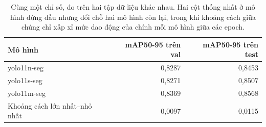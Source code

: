 \begin{table}[H]
\centering
\caption{Cùng một chỉ số, đo trên hai tập dữ liệu khác nhau. Hai cột thống nhất ở mô hình đứng đầu nhưng đổi chỗ hai mô hình còn lại, trong khi khoảng cách giữa chúng chỉ xấp xỉ mức dao động của chính mỗi mô hình giữa các epoch.}
\label{tab:ordering}
\small
\begin{tabular}{l r r}
\toprule
Mô hình & mAP50-95 trên val & mAP50-95 trên test \\
\midrule
yolo11n-seg & 0{,}8287 & 0{,}8453 \\
yolo11s-seg & 0{,}8271 & 0{,}8507 \\
yolo11m-seg & 0{,}8369 & 0{,}8568 \\
\midrule
Khoảng cách lớn nhất--nhỏ nhất & 0{,}0097 & 0{,}0115 \\
\bottomrule
\end{tabular}
\end{table}
